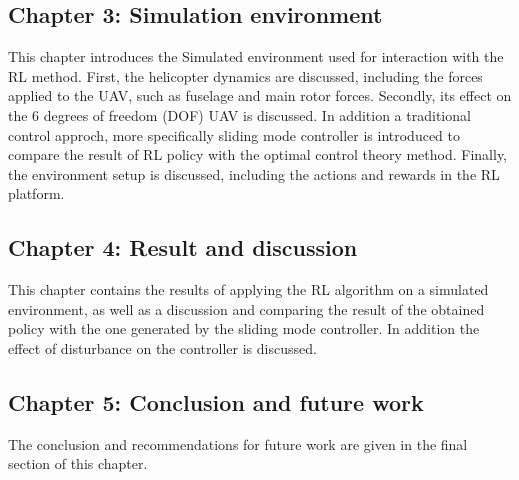 \subsection{Chapter 3: Simulation environment}

This chapter introduces the Simulated environment used for interaction with the RL method. First, the helicopter dynamics are discussed, including the forces applied to the UAV, such as fuselage and main rotor forces. Secondly, its effect on the 6 degrees of freedom (DOF) UAV is discussed. In addition a traditional control approch, more specifically sliding mode controller is introduced to compare the result of RL policy with the optimal control theory method.  Finally, the environment setup is discussed, including the actions and rewards in the RL platform.

\subsection{Chapter 4: Result and discussion}

This chapter contains the results of applying the RL algorithm on a simulated environment, as well as a discussion and comparing the result of the obtained policy with the one generated by the sliding mode controller. In addition the effect of disturbance on the controller is discussed. 

\subsection{Chapter 5: Conclusion and future work}

The conclusion and recommendations for future work are given in the final section of this chapter.
